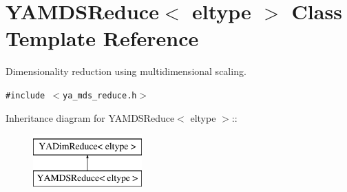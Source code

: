 \hypertarget{class_y_a_m_d_s_reduce}{
\section{YAMDSReduce$<$ eltype $>$ Class Template Reference}
\label{class_y_a_m_d_s_reduce}
}
Dimensionality reduction using multidimensional scaling.  


{\tt \#include $<$ya\_\-mds\_\-reduce.h$>$}

Inheritance diagram for YAMDSReduce$<$ eltype $>$::\begin{figure}[H]
\begin{center}
\leavevmode
\includegraphics[height=2cm]{class_y_a_m_d_s_reduce}
\end{center}
\end{figure}
